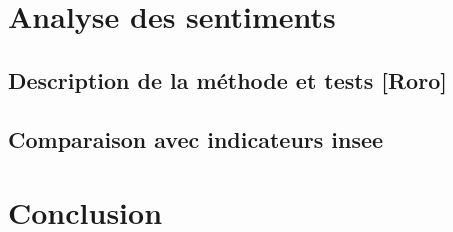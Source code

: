 \documentclass[11pt,french,french]{article}
\begin{document}
\section{Analyse des sentiments}\label{sec:sentimentalAnalysis}

\subsection{Description de la méthode et tests
{[}Roro{]}}\label{description-de-la-muxe9thode-et-tests-roro}

\subsection{Comparaison avec indicateurs
insee}\label{comparaison-avec-indicateurs-insee}

\section*{Conclusion}\label{conclusion}

\newpage

\nocite{*}
\end{document}
